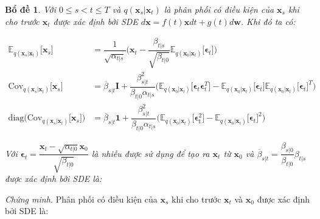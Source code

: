 \documentclass[14pt, a4paper]{article}
\numberwithin{equation}{section}
\numberwithin{figure}{section}
\newtheorem{bd}{Bổ đề}
\numberwithin{dl}{section}
\numberwithin{md}{section}
\numberwithin{bd}{section}
\numberwithin{dn}{section}
\numberwithin{hq}{section}
\begin{document}
    \begin{bd} \label{bd:Continous-Conditional-Distribution}
        Với $0 \leq s < t \leq T$ và $q(\boldsymbol{x}_s \vert \boldsymbol{x}_t)$ là phân phối có điều kiện của $\boldsymbol{x}_s$ khi cho trước $\boldsymbol{x}_t$ được xác định bởi SDE $d \boldsymbol{x} = f(t) \boldsymbol{x} dt + g(t) d \boldsymbol{w}$. Khi đó ta có:

        \begin{equation}
            \begin{aligned}
                \mathbb{E}_{q(\boldsymbol{x}_s \vert \boldsymbol{x}_t)} \lbrack \boldsymbol{x}_s \rbrack &= \dfrac{1}{\sqrt{\alpha_{t \vert s}}} \big( \boldsymbol{x}_t - \dfrac{\beta_{t \vert s}}{\sqrt{\beta_{t \vert 0}}} \mathbb{E}_{q(\boldsymbol{x}_0 \vert \boldsymbol{x}_t)} \lbrack \boldsymbol{\epsilon}_t \rbrack \big) \\
                \mathrm{Cov}_{q(\boldsymbol{x}_s \vert \boldsymbol{x}_t)} \lbrack \boldsymbol{x}_s \rbrack &= \overline{\beta}_{s \vert t} \boldsymbol{I} + \dfrac{\beta_{s \vert t}^2}{\beta_{t \vert 0} \alpha_{t \vert s}} \big( \mathbb{E}_{q(\boldsymbol{x}_0 \vert \boldsymbol{x}_t)} \lbrack \boldsymbol{\epsilon}_t \boldsymbol{\epsilon}_t^T \rbrack - \mathbb{E}_{q(\boldsymbol{x}_0 \vert \boldsymbol{x}_t)} \lbrack \boldsymbol{\epsilon}_t \rbrack \mathbb{E}_{q(\boldsymbol{x}_0 \vert \boldsymbol{x}_t)} \lbrack \boldsymbol{\epsilon}_t \rbrack^T \big) \\
                \mathrm{diag} \big( \mathrm{Cov}_{q(\boldsymbol{x}_s \vert \boldsymbol{x}_t)} \lbrack \boldsymbol{x}_s \rbrack \big) &= \overline{\beta}_{s \vert t} \boldsymbol{1} + \dfrac{\beta_{s \vert t}^2}{\beta_{t \vert 0} \alpha_{t \vert s}} \big( \mathbb{E}_{q(\boldsymbol{x}_0 \vert \boldsymbol{x}_t)} \lbrack \boldsymbol{\epsilon}_t^2 \rbrack - \mathbb{E}_{q(\boldsymbol{x}_0 \vert \boldsymbol{x}_t)} \lbrack \boldsymbol{\epsilon}_t \rbrack^2 \big)
            \end{aligned}
        \end{equation}

        Với $\boldsymbol{\epsilon}_t = \dfrac{\boldsymbol{x}_t - \sqrt{\alpha_{t \vert 0}} \boldsymbol{x}_0}{\sqrt{\beta_{t \vert 0}}}$ là nhiễu được sử dụng để tạo ra $\boldsymbol{x}_t$ từ $\boldsymbol{x}_0$ và $\overline{\beta}_{s \vert t} = \dfrac{\beta_{s \vert 0}}{\beta_{t \vert 0}} \beta_{t \vert s}$ được xác định bởi SDE là:
    \end{bd}

    \textit{Chứng minh.}
    Phân phối có điều kiện của $\boldsymbol{x}_s$ khi cho trước $\boldsymbol{x}_t$ và $\boldsymbol{x}_0$ được xác định bởi SDE là:
\end{document}
